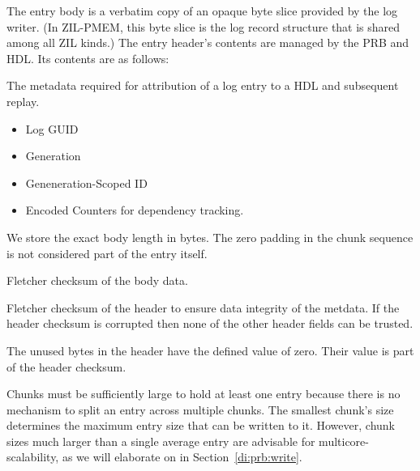 \documentclass[12pt,a4paper,twoside]{book}
\begin{document}
The entry body is a verbatim copy of an opaque byte slice provided by the log writer.
(In ZIL-PMEM, this byte slice is the log record structure that is shared among all ZIL kinds.)
The entry header's contents are managed by the PRB and HDL.
Its contents are as follows:
\begin{description}[noitemsep,leftmargin=1.5cm,labelindent=1cm]
    \item[HDL-scoped metadata] The metadata required for attribution of a log entry to a HDL and subsequent replay.
    \begin{itemize}
        \item Log GUID
        \item Generation
        \item Geneneration-Scoped ID
        \item Encoded Counters for dependency tracking.
    \end{itemize}
    \item[Body Length] We store the exact body length in bytes.
    The zero padding in the chunk sequence is not considered part of the entry itself.
    \item[Body Checksum] Fletcher checksum of the body data.
    \item[Header Checksum] Fletcher checksum of the header to ensure data integrity of the metdata.
    If the header checksum is corrupted then none of the other header fields can be trusted.
    \item[Zero Padding] The unused bytes in the header have the defined value of zero.
    Their value is part of the header checksum.
\end{description}

Chunks must be sufficiently large to hold at least one entry because there is no mechanism to split an entry across multiple chunks.
The smallest chunk's size determines the maximum entry size that can be written to it.
However, chunk sizes much larger than a single average entry are advisable for multicore-scalability, as we will elaborate on in Section~\ref{di:prb:write}.
\end{document}
